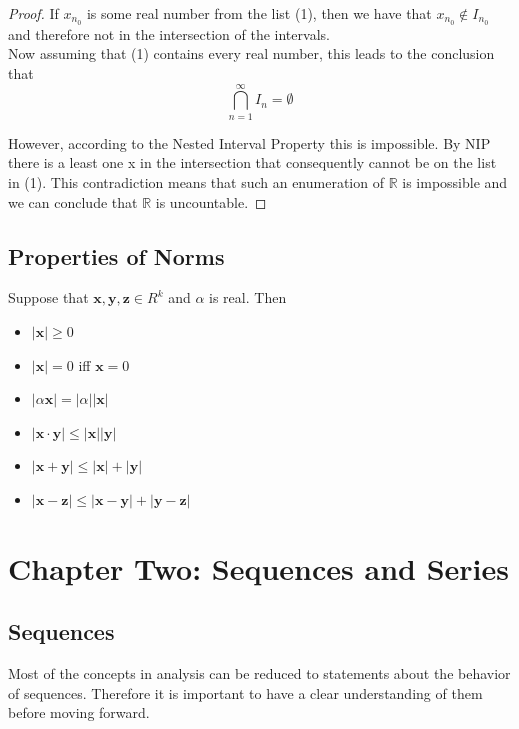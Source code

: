 \documentclass{tufte-book}
\theoremstyle{definition}
\numberwithin{section}{chapter}
\begin{document}
\begin{proof}
If $x_{n_0}$ is some real number from the list (1), then we have that $x_{n_0} \notin I_{n_0}$ and therefore not in the intersection of the intervals.\\  Now assuming that (1) contains every real number, this leads to the conclusion that 
\[ \bigcap_{n=1}^{\infty}I_n = \emptyset \]

However, according to the Nested Interval Property this is impossible.  By NIP there is a least one x in the intersection that consequently cannot be on the list in (1).  This contradiction means that such an enumeration of $\mathbb{R}$ is impossible and we can conclude that $\mathbb{R}$ is uncountable.



\end{proof}

\section{Properties of Norms}


Suppose that $\mathbf{x,y,z} \in R^k$ and $\alpha$ is real. Then
\begin{itemize}[$\diamond$]
	\item $|\mathbf{x}| \geq 0$
	\item $|\mathbf{x}| = 0$ iff $\mathbf{x} = 0$
	\item $|\alpha \mathbf{x}| = |\alpha||\mathbf{x}|$
	\item $|\mathbf{x} \cdot \mathbf{y}| \leq |\mathbf{x}| |\mathbf{y}| $
	\item $|\mathbf{x+y}| \leq |\mathbf{x}|  + |\mathbf{y}|$
	\item $|\mathbf{x}- \mathbf{z}| \leq |\mathbf{x-y}| + |\mathbf{y-z}|$     
\end{itemize}



\setcounter{chapter}{2}
\chapter{Chapter Two: Sequences and Series}


\setcounter{section}{0}
\setcounter{theorem}{0}
\setcounter{definition}{0}
\section{Sequences}

Most of the concepts in analysis can be reduced to statements about the behavior of sequences.  Therefore it is important to have a clear understanding of them before moving forward.
\end{document}
